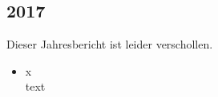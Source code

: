 \subsection*{2017}
\begin{history}

    Dieser Jahresbericht ist leider verschollen.

    \begin{itemize}

        \item x\\
              text

    \end{itemize}

\end{history}
